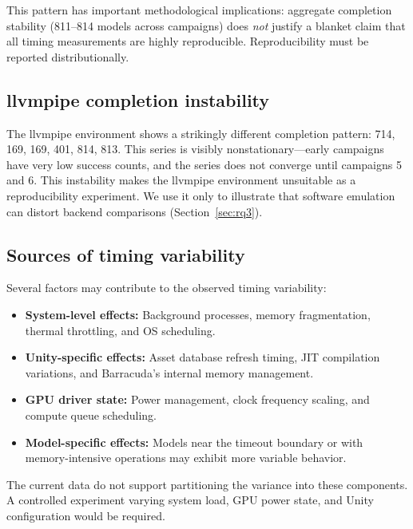 \documentclass[10pt,twocolumn,letterpaper]{article}
\begin{document}
This pattern has important methodological implications: aggregate completion stability (811--814 models across campaigns) does \emph{not} justify a blanket claim that all timing measurements are highly reproducible. Reproducibility must be reported distributionally.

\subsection{llvmpipe completion instability}

The llvmpipe environment shows a strikingly different completion pattern: 714, 169, 169, 401, 814, 813. This series is visibly nonstationary---early campaigns have very low success counts, and the series does not converge until campaigns 5 and 6. This instability makes the llvmpipe environment unsuitable as a reproducibility experiment. We use it only to illustrate that software emulation can distort backend comparisons (Section~\ref{sec:rq3}).

\subsection{Sources of timing variability}

Several factors may contribute to the observed timing variability:
\begin{itemize}[nosep,leftmargin=*]
  \item \textbf{System-level effects:} Background processes, memory fragmentation, thermal throttling, and OS scheduling.
  \item \textbf{Unity-specific effects:} Asset database refresh timing, JIT compilation variations, and Barracuda's internal memory management.
  \item \textbf{GPU driver state:} Power management, clock frequency scaling, and compute queue scheduling.
  \item \textbf{Model-specific effects:} Models near the timeout boundary or with memory-intensive operations may exhibit more variable behavior.
\end{itemize}

The current data do not support partitioning the variance into these components. A controlled experiment varying system load, GPU power state, and Unity configuration would be required.

\end{document}
